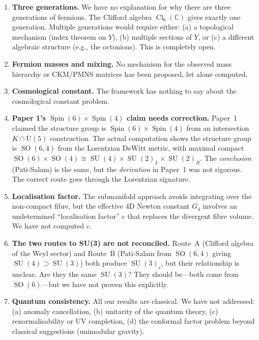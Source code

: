 \documentclass[12pt,a4paper]{article}
\DeclareMathOperator{\Spin}{Spin}
\DeclareMathOperator{\SO}{SO}
\DeclareMathOperator{\SU}{SU}
\DeclareMathOperator{\Cl}{Cl}
\begin{document}
\begin{gapbox}

\begin{enumerate}
\item \textbf{Three generations.} We have no explanation for why there are three generations of fermions. The Clifford algebra $\Cl_6(\mathbb{C})$ gives exactly one generation. Multiple generations would require either: (a) a topological mechanism (index theorem on $Y$), (b) multiple sections of $Y$, or (c) a different algebraic structure (e.g., the octonions). This is completely open.

\item \textbf{Fermion masses and mixing.} No mechanism for the observed mass hierarchy or CKM/PMNS matrices has been proposed, let alone computed.

\item \textbf{Cosmological constant.} The framework has nothing to say about the cosmological constant problem.

\item \textbf{Paper 1's $\Spin(6)\times\Spin(4)$ claim needs correction.} Paper~1 claimed the structure group is $\Spin(6)\times\Spin(4)$ from an intersection $K \cap \mathrm{U}(5)$ construction. The actual computation shows the structure group is $\SO(6,4)$ from the Lorentzian DeWitt metric, with maximal compact $\SO(6)\times\SO(4) \cong \SU(4)\times\SU(2)_L\times\SU(2)_R$. The \textit{conclusion} (Pati-Salam) is the same, but the \textit{derivation} in Paper~1 was not rigorous. The correct route goes through the Lorentzian signature.

\item \textbf{Localisation factor.} The submanifold approach avoids integrating over the non-compact fibre, but the effective 4D Newton constant $G_4$ involves an undetermined ``localisation factor'' $c$ that replaces the divergent fibre volume. We have not computed $c$.

\item \textbf{The two routes to SU(3) are not reconciled.} Route~A (Clifford algebra of the Weyl sector) and Route~B (Pati-Salam from $\SO(6,4)$ giving $\SU(4) \supset \SU(3)$) both produce $\SU(3)_c$, but their relationship is unclear. Are they the same $\SU(3)$? They should be---both come from $\SO(6)$---but we have not proven this explicitly.

\item \textbf{Quantum consistency.} All our results are classical. We have not addressed: (a) anomaly cancellation, (b) unitarity of the quantum theory, (c) renormalisability or UV completion, (d) the conformal factor problem beyond classical suggestions (unimodular gravity).
\end{enumerate}
\end{gapbox}
\end{document}

